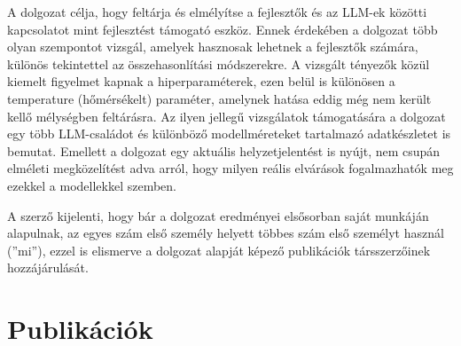 \documentclass[12pt,a4paper]{extarticle}
\begin{document}
A dolgozat célja, hogy feltárja és elmélyítse a fejlesztők és az LLM-ek közötti kapcsolatot mint fejlesztést támogató eszköz.
Ennek érdekében a dolgozat több olyan szempontot vizsgál, amelyek hasznosak lehetnek a fejlesztők számára, különös tekintettel az összehasonlítási módszerekre.
A vizsgált tényezők közül kiemelt figyelmet kapnak a hiperparaméterek, ezen belül is különösen a temperature (hőmérsékelt) paraméter, amelynek hatása eddig még nem került kellő mélységben feltárásra.
Az ilyen jellegű vizsgálatok támogatására a dolgozat egy több LLM-családot és különböző modellméreteket tartalmazó adatkészletet is bemutat.
Emellett a dolgozat egy aktuális helyzetjelentést is nyújt, nem csupán elméleti megközelítést adva arról, hogy milyen reális elvárások fogalmazhatók meg ezekkel a modellekkel szemben.

\vspace*{3em}


A szerző kijelenti, hogy bár a dolgozat eredményei elsősorban saját munkáján alapulnak, az egyes szám első személy helyett többes szám első személyt használ (''mi''), ezzel is elismerve a dolgozat alapját képező publikációk társszerzőinek hozzájárulását.


\newpage

\undef{\chapter}
\newcommand{\chapter}{\section}
%

\chapter*{Publikációk}
\end{document}
